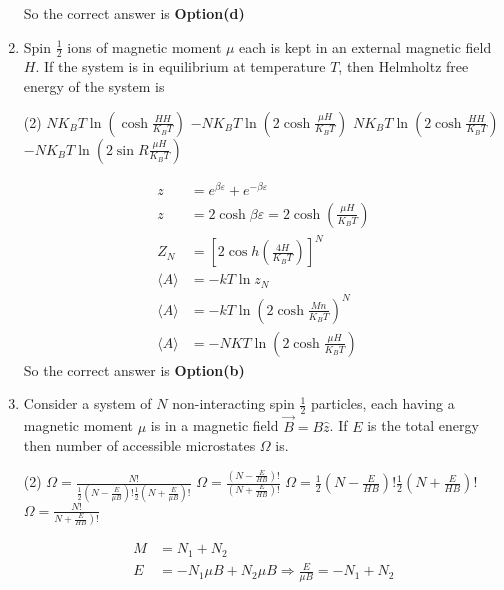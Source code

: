 \begin{enumerate}
\begin{answer}
	So the correct answer is \textbf{Option(d)}
\end{answer}
	\item Spin $\frac{1}{2}$ ions of magnetic moment $\mu$ each is kept in an external magnetic field $H$. If the system is in equilibrium at temperature $T$, then Helmholtz free energy of the system is 
		\begin{tasks}(2)
			\task[\textbf{a.}]$N K_{B} T \ln \left(\cosh \frac{H H}{K_{B} T}\right)$
			\task[\textbf{b.}]$-N K_{B} T \ln \left(2 \cosh \frac{\mu H}{K_{B} T}\right)$
			\task[\textbf{c.}]$N K_{B} T \ln \left(2 \cosh \frac{H H}{K_{B} T}\right)$
			\task[\textbf{d.}] $-N K_{B} T \ln \left(2 \sin R \frac{\mu H}{K_{B} T}\right)$
		\end{tasks}
	\begin{answer}
		\begin{align*}
		z&=e^{\beta \varepsilon}+e^{-\beta \varepsilon}\\
		z&=2 \cosh \beta \varepsilon=2 \cosh \left(\frac{\mu H}{K_{B} T}\right)\\
		Z_{N}&=\left[2 \cos h\left(\frac{4 H}{K_{B} T}\right)\right]^{N}\\
		\langle A\rangle&=-k T \ln z_{N}\\
		\langle A\rangle&=-k T \ln \left(2 \cosh \frac{M n}{K_{B} T}\right)^{N}\\
		\langle A\rangle&=-N K T \ln \left(2 \cosh \frac{\mu H}{K_{B} T}\right)
		\end{align*}
		So the correct answer is \textbf{Option(b)}
	\end{answer}
\item Consider a system of $N$ non-interacting spin $\frac{1}{2}$ particles, each having a magnetic moment $\mu$ is in a magnetic field $\vec{B}=B \hat{z} $. If $E$ is the total energy then number of accessible microstates $\Omega$ is.
\begin{tasks}(2)
	\task[\textbf{a.}]$\Omega=\frac{N !}{\frac{1}{2}\left(N-\frac{E}{\mu B}\right) ! \frac{1}{2}\left(N+\frac{E}{\mu B}\right) !}$
	\task[\textbf{b.}]$\Omega=\frac{\left(N-\frac{E}{H B}\right) !}{\left(N+\frac{E}{H B}\right) !}$
	\task[\textbf{c.}]$\Omega=\frac{1}{2}\left(N-\frac{E}{H B}\right) ! \frac{1}{2}\left(N+\frac{E}{H B}\right) !$
	\task[\textbf{d.}] $\Omega=\frac{N !}{\left.N+\frac{E}{H B}\right) !}$
\end{tasks}
\begin{answer}
	\begin{align*}
	M&=N_{1}+N_{2}\\
	E&=-N_{1} \mu B+N_{2} \mu B \Rightarrow \frac{E}{\mu B}=-N_{1}+N_{2}\\

\end{align*}
\end{answer}
\end{enumerate}

